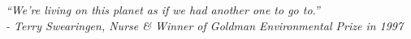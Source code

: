\clearpage{\pagestyle{empty}\cleardoublepage}
\begin{titlepage}
	\thispagestyle{empty}
	\topmargin=6.5cm 
	\raggedleft
	\large
	\em
	``We're living on this planet as if we had another one to go to.”\\
	- Terry Swearingen, Nurse \& Winner of Goldman Environmental Prize in 1997
	\newpage
	\clearpage{\pagestyle{empty}\cleardoublepage}
\end{titlepage}